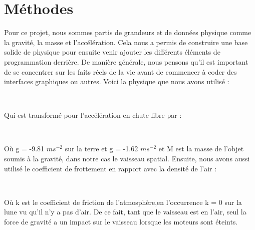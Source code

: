 \section{Méthodes}

Pour ce projet, nous sommes partis de grandeurs et de données physique comme la gravité, la masse et l'accélération. Cela nous a permis de construire une base solide de physique pour ensuite venir ajouter les différents éléments de programmation derrière. De manière générale, nous pensons qu'il est important de se concentrer sur les faits réels de la vie avant de commencer à coder des interfaces graphiques ou autres.
Voici la physique que nous avons utilisé :
\begin{center}
\fontsize{14.4}{14.4}\\
\end{center}
Qui est transformé pour l’accélération en chute libre par :
\begin{center}
\fontsize{14.4}{14.4}\\
\end{center}
Où g = -9.81 $ms^{-2}$ sur la terre et g = -1.62 $ms^{-2}$ et M est la masse de l’objet soumis à la gravité, dans notre cas le vaisseau spatial.
Ensuite, nous avons aussi utilisé le coefficient de frottement en rapport avec la densité de l’air :
\begin{center}
\fontsize{14.4}{14.4}\\
\end{center}
Où k est le coefficient de friction de l'atmosphère,en l'occurrence k = 0 sur la lune vu qu'il n'y a pas d'air. De ce fait, tant que le vaisseau est en l'air, seul la force de gravité a un impact sur le vaisseau lorsque les moteurs sont éteints.\\
